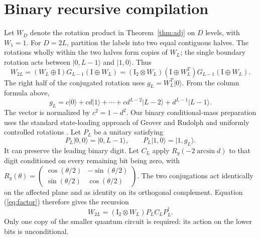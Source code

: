 \documentclass[11pt]{article}
\newcommand{\ket}[1]{\lvert #1\rangle}
\newcommand{\id}{\mathrm{I}}
\begin{document}
\section{Binary recursive compilation}
\label{sec:recursive}
Let $W_D$ denote the rotation product in Theorem~\ref{thm:adj} on $D$ levels, with $W_1=1$. For $D=2L$, partition the labels into two equal contiguous halves. The rotations wholly within the two halves form copies of $W_L$; the single boundary rotation acts between $\ket{0,L-1}$ and $\ket{1,0}$. Thus
\begin{equation}\label{eq:factor}
 W_{2L}=(W_L\oplus\id)G_{L-1}(\id\oplus W_L)
 = (\id_2\otimes W_L)(\id\oplus W_L^T)G_{L-1}(\id\oplus W_L).
\end{equation}
The right half of the conjugated rotation uses $g_L=W_L^T\ket{0}$. From the column formula above,
\begin{equation}\label{eq:g}
 g_L=c\ket{0}+cd\ket{1}+\cdots+cd^{L-2}\ket{L-2}+d^{L-1}\ket{L-1}.
\end{equation}
The vector is normalized by $c^2=1-d^2$. Our binary conditional-mass preparation uses the standard state-loading approach of Grover and Rudolph \cite{grover} and uniformly controlled rotations \cite{mottonen}. Let $P_L$ be a unitary satisfying
\begin{equation}
 P_L\ket{0,0}=\ket{0,L-1},\qquad P_L\ket{1,0}=\ket{1,g_L}.
\end{equation}
It can preserve the leading binary digit. Let $C_L$ apply $R_y(-2\arcsin d)$ to that digit conditioned on every remaining bit being zero, with $R_y(\theta)=\left(\begin{smallmatrix}\cos(\theta/2)&-\sin(\theta/2)\\\sin(\theta/2)&\cos(\theta/2)\end{smallmatrix}\right)$. The two conjugations act identically on the affected plane and as identity on its orthogonal complement. Equation (\ref{eq:factor}) therefore gives the recursion
\begin{equation}\label{eq:rec}
 \boxed{ W_{2L}=(\id_2\otimes W_L)P_L C_L P_L^\dagger. }
\end{equation}
Only one copy of the smaller quantum circuit is required: its action on the lower bits is unconditional.
\end{document}

